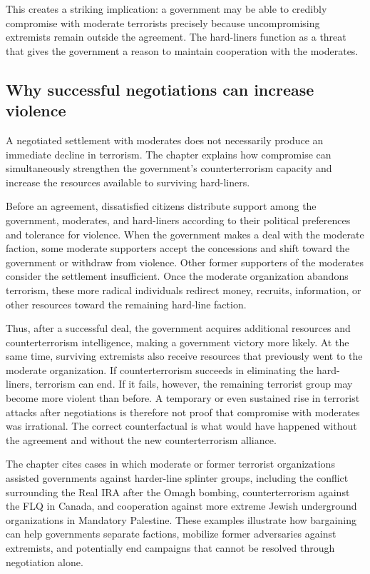 This creates a striking implication: a government may be able to credibly compromise with moderate terrorists precisely because uncompromising extremists remain outside the agreement. The hard-liners function as a threat that gives the government a reason to maintain cooperation with the moderates.

\subsection{Why successful negotiations can increase violence}

A negotiated settlement with moderates does not necessarily produce an immediate decline in terrorism. The chapter explains how compromise can simultaneously strengthen the government's counterterrorism capacity and increase the resources available to surviving hard-liners.

Before an agreement, dissatisfied citizens distribute support among the government, moderates, and hard-liners according to their political preferences and tolerance for violence. When the government makes a deal with the moderate faction, some moderate supporters accept the concessions and shift toward the government or withdraw from violence. Other former supporters of the moderates consider the settlement insufficient. Once the moderate organization abandons terrorism, these more radical individuals redirect money, recruits, information, or other resources toward the remaining hard-line faction.

Thus, after a successful deal, the government acquires additional resources and counterterrorism intelligence, making a government victory more likely. At the same time, surviving extremists also receive resources that previously went to the moderate organization. If counterterrorism succeeds in eliminating the hard-liners, terrorism can end. If it fails, however, the remaining terrorist group may become more violent than before. A temporary or even sustained rise in terrorist attacks after negotiations is therefore not proof that compromise with moderates was irrational. The correct counterfactual is what would have happened without the agreement and without the new counterterrorism alliance.

The chapter cites cases in which moderate or former terrorist organizations assisted governments against harder-line splinter groups, including the conflict surrounding the Real IRA after the Omagh bombing, counterterrorism against the FLQ in Canada, and cooperation against more extreme Jewish underground organizations in Mandatory Palestine. These examples illustrate how bargaining can help governments separate factions, mobilize former adversaries against extremists, and potentially end campaigns that cannot be resolved through negotiation alone.

